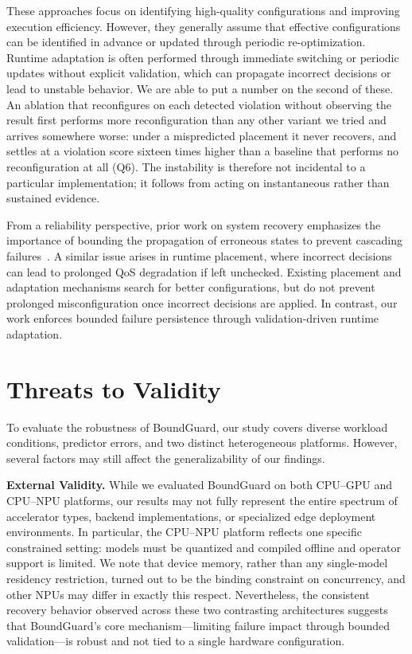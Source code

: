 \documentclass[conference]{IEEEtran}
\begin{document}
{These approaches focus on identifying high-quality configurations and improving execution efficiency.
However, they generally assume that effective configurations can be identified in advance or updated through periodic re-optimization.
Runtime adaptation is often performed through immediate switching or periodic updates without explicit validation, which can propagate incorrect decisions or lead to unstable behavior.
\textcolor{navyblue}{We are able to put a number on the second of these. An ablation that reconfigures on each detected violation without observing the result first performs more reconfiguration than any other variant we tried and arrives somewhere worse: under a mispredicted placement it never recovers, and settles at a violation score sixteen times higher than a baseline that performs no reconfiguration at all (Q6). The instability is therefore not incidental to a particular implementation; it follows from acting on instantaneous rather than sustained evidence.}

From a reliability perspective, prior work on system recovery emphasizes the importance of bounding the propagation of erroneous states to prevent cascading failures~\cite{elnozahy2002survey}.
A similar issue arises in runtime placement, where incorrect decisions can lead to prolonged QoS degradation if left unchecked.
Existing placement and adaptation mechanisms search for better configurations, but do not prevent prolonged misconfiguration once incorrect decisions are applied.
In contrast, our work enforces bounded failure persistence through validation-driven runtime adaptation.


\section{Threats to Validity}

To evaluate the robustness of BoundGuard, our study covers diverse workload conditions, predictor errors, and two distinct heterogeneous platforms. However, several factors may still affect the generalizability of our findings.

\noindent\textbf{External Validity.} 
While we evaluated BoundGuard on both CPU--GPU and CPU--NPU platforms, our results may not fully represent the entire spectrum of accelerator types, backend implementations, or specialized edge deployment environments. \textcolor{navyblue}{In particular, the CPU--NPU platform reflects one specific constrained setting: models must be quantized and compiled offline and operator support is limited. We note that device memory, rather than any single-model residency restriction, turned out to be the binding constraint on concurrency, and other NPUs may differ in exactly this respect.} Nevertheless, the consistent recovery behavior observed across these two contrasting architectures suggests that BoundGuard’s core mechanism—limiting failure impact through bounded validation—is robust and not tied to a single hardware configuration.

}
\end{document}
